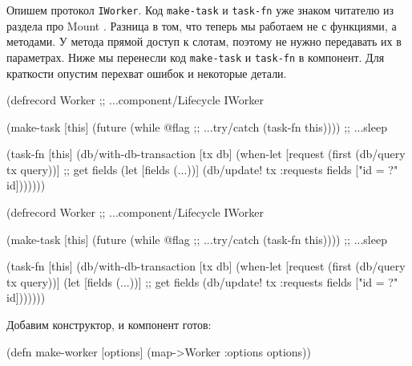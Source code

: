 
Опишем протокол \verb|IWorker|. Код \verb|make-task| и \verb|task-fn| уже знаком
читателю из раздела про Mount . Разница в том, что теперь мы
работаем не с функциями, а методами. У метода прямой доступ к слотам, поэтому не
нужно передавать их в параметрах. Ниже мы перенесли код \verb|make-task| и
\verb|task-fn| в компонент. Для краткости опустим перехват ошибок и некоторые
детали.

\ifnarrow

\begin{english}
  \begin{clojure}
(defrecord Worker
  ;; ...component/Lifecycle
  IWorker

  (make-task [this]
    (future
      (while @flag    ;; ...try/catch
        (task-fn this)))) ;; ...sleep

  (task-fn [this]
    (db/with-db-transaction [tx db]
      (when-let [request
                  (first
                    (db/query tx query))]
        ;; get fields
        (let [fields (...))]
          (db/update! tx :requests
            fields ["id = ?" id]))))))
  \end{clojure}
\end{english}

\else

\begin{english}
  \begin{clojure}
(defrecord Worker
  ;; ...component/Lifecycle
  IWorker

  (make-task [this]
    (future
      (while @flag        ;; ...try/catch
        (task-fn this)))) ;; ...sleep

  (task-fn [this]
    (db/with-db-transaction [tx db]
      (when-let [request (first (db/query tx query))]
        (let [fields (...))] ;; get fields
          (db/update! tx :requests
                      fields ["id = ?" id]))))))
  \end{clojure}
\end{english}

\fi

\noindent
Добавим конструктор, и компонент готов:


\begin{english}
  \begin{clojure}
(defn make-worker
  [options]
  (map->Worker {:options options}))
  \end{clojure}
\end{english}

